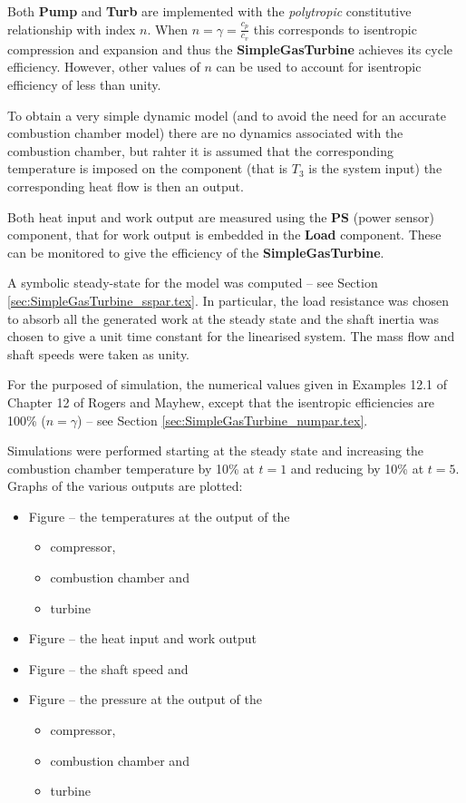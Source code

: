 Both \textbf{Pump} and \textbf{Turb} are implemented with the
\emph{polytropic} constitutive relationship with index $n$. When
$n=\gamma=\frac{c_p}{c_v}$ this corresponds to isentropic compression
and expansion and thus the \textbf{SimpleGasTurbine} achieves its
cycle efficiency. However, other values of $n$ can be used to account
for isentropic efficiency of less than unity.

To obtain a very simple dynamic model (and to avoid the need for an
accurate combustion chamber model) there are no dynamics associated
with the combustion chamber, but rahter it is assumed that the
corresponding temperature is imposed on the component (that is $T_3$
is the system input) the corresponding heat flow is then an output.

Both heat input and work output are measured using the \textbf{PS}
(power sensor) component, that for work output is embedded in the
\textbf{Load} component. These can be monitored to give the efficiency
of the \textbf{SimpleGasTurbine}.

A symbolic steady-state for the model was computed -- see Section
\ref{sec:SimpleGasTurbine_sspar.tex}. In particular, the load
resistance was chosen to absorb all the generated work at the steady
state and the shaft inertia was chosen to give a unit time constant
for the linearised system. The mass flow and shaft speeds were taken
as unity.

For the purposed of simulation, the numerical values given in Examples
12.1 of Chapter 12 of Rogers and Mayhew, except that the isentropic
efficiencies are 100\% ($n=\gamma$) -- see Section
\ref{sec:SimpleGasTurbine_numpar.tex}.

Simulations were performed starting at the steady state and increasing
the combustion chamber temperature by 10\% at $t=1$ and reducing by
10\% at $t=5$. Graphs of the various outputs are plotted:
\begin{itemize}
\item Figure
  -- the temperatures at the output of the
  \begin{itemize}
  \item compressor,
  \item combustion chamber and
  \item turbine
  \end{itemize}
\item Figure
  -- the heat input and work output
\item Figure
   -- the shaft speed and
\item Figure
  -- the pressure at the output of the
  \begin{itemize}
  \item compressor,
  \item combustion chamber and
  \item turbine
  \end{itemize}
\end{itemize}


